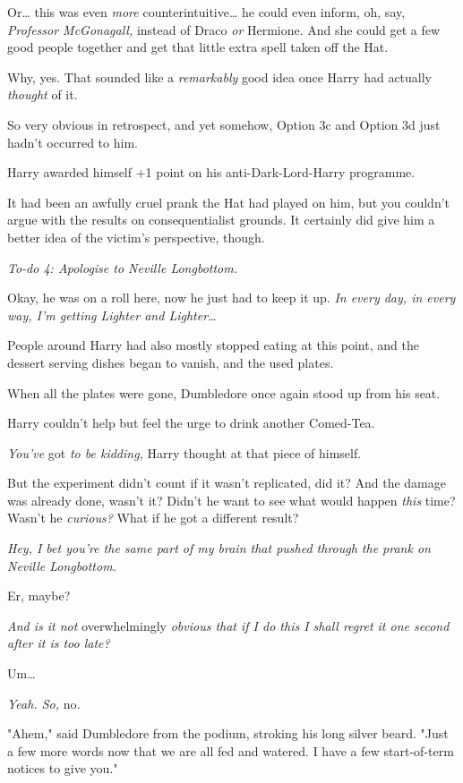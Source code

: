 Or{\ldots} this was even \emph{more} counterintuitive{\ldots} he could even
inform, oh, say, \emph{Professor McGonagall,} instead of Draco \emph{or}
Hermione. And she could get a few good people together and get that little
extra spell taken off the Hat.

Why, yes. That sounded like a \emph{remarkably} good idea once Harry had
actually \emph{thought} of it.

So very obvious in retrospect, and yet somehow, Option 3c and Option 3d just
hadn't occurred to him.

Harry awarded himself +1 point on his anti-Dark-Lord-Harry programme.

It had been an awfully cruel prank the Hat had played on him, but you couldn't
argue with the results on consequentialist grounds. It certainly did give him a
better idea of the victim's perspective, though.

\emph{To-do 4: Apologise to Neville Longbottom.}

Okay, he was on a roll here, now he just had to keep it up. \emph{In every day,
in every way, I'm getting Lighter and Lighter{\ldots}}

People around Harry had also mostly stopped eating at this point, and the
dessert serving dishes began to vanish, and the used plates.

When all the plates were gone, Dumbledore once again stood up from his seat.

Harry couldn't help but feel the urge to drink another Comed-Tea.

\emph{You've} got \emph{to be kidding,} Harry thought at that piece of himself.

But the experiment didn't count if it wasn't replicated, did it? And the damage
was already done, wasn't it? Didn't he want to see what would happen
\emph{this} time? Wasn't he \emph{curious?} What if he got a different result?

\emph{Hey, I bet you're the same part of my brain that pushed through the prank
on Neville Longbottom.}

Er, maybe?

\emph{And is it not} overwhelmingly \emph{obvious that if I do this I shall
regret it one second after it is too late?}

Um{\ldots}

\emph{Yeah. So,} no\emph{.}

"Ahem," said Dumbledore from the podium, stroking his long silver beard. "Just
a few more words now that we are all fed and watered. I have a few
start-of-term notices to give you."

